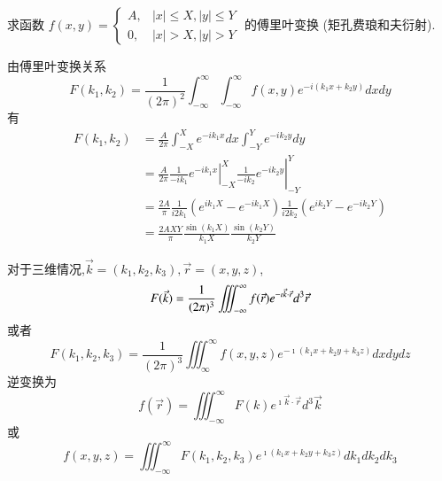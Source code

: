 \begin{example}
    求函数 $f(x, y)= \begin{cases}A, & |x| \leq X,|y| \leq Y \\ 0, & |x|>X,|y|>Y\end{cases}$ 的傅里叶变换 (矩孔费琅和夫衍射).
\end{example}
\begin{solution}
    由傅里叶变换关系
$$
F\left(k_1, k_2\right)=\frac{1}{(2 \pi)^2} \int_{-\infty}^{\infty} \int_{-\infty}^{\infty} f(x, y) e^{-i\left(k_1 x+k_2 y\right)} d x d y
$$
有
$$
\begin{aligned}
F\left(k_1, k_2\right) & =\frac{A}{2 \pi} \int_{-X}^X e^{-i k_1 x} d x \int_{-Y}^Y e^{-i k_2 y} d y \\
& =\left.\left.\frac{A}{2 \pi} \frac{1}{-i k_1} e^{-i k_1 x}\right|_{-X} ^X \frac{1}{-i k_2} e^{-i k_2 y}\right|_{-Y} ^Y \\
& =\frac{2A}{\pi} \frac{1}{i 2 k_1}\left(e^{i k_1 X}-e^{-i k_1 X}\right) \frac{1}{i 2 k_2}\left(e^{i k_2 Y}-e^{-i k_2 Y}\right) \\
& =\frac{2A X Y}{\pi} \frac{\sin \left(k_1 X\right)}{k_1 X} \frac{\sin \left(k_2 Y\right)}{k_2 Y}
\end{aligned}
$$
\end{solution}

对于三维情况,$\vec{k}=\left(k_1, k_2, k_3\right), \vec{r}=(x, y, z)$,
\begin{equation}
    F(\vec{k})=\frac{1}{(2 \pi)^3} \iiint_{-\infty}^{\infty} f(\vec{r}) e^{-\imath  \vec{k} \cdot \vec{r}} d^3 \vec{r} \\
\end{equation}
或者
\begin{equation}
    F\left(k_1, k_2, k_3\right)=\frac{1}{(2 \pi)^3} \iiint_{\infty}^{\infty} f(x, y, z) e^{-\imath\left(k_1 x+k_2 y+k_3 z\right)} d x d y d z 
\end{equation}
逆变换为
\begin{equation}
     f(\vec{r})=\iiint_{-\infty}^{\infty} F(k) e^{\imath \vec{k} \cdot \vec{r}} d^3 \vec{k} 
\end{equation}  
或
\begin{equation}
f(x, y, z)=\iiint_{-\infty}^{\infty} F\left(k_1, k_2, k_3\right) e^{\imath\left(k_1 x+k_2 y+k_3 z\right)} d k_1 d k_2 d k_3 
\end{equation} 